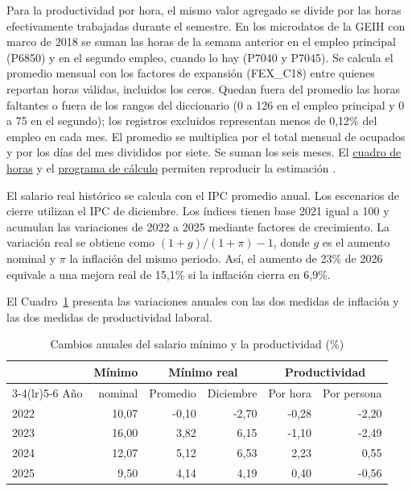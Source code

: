 Para la productividad por hora, el mismo valor agregado se divide por las horas efectivamente trabajadas durante el semestre. En los microdatos de la GEIH con marco de 2018 se suman las horas de la semana anterior en el empleo principal (P6850) y en el segundo empleo, cuando lo hay (P7040 y P7045). Se calcula el promedio mensual con los factores de expansión (FEX\_C18) entre quienes reportan horas válidas, incluidos los ceros. Quedan fuera del promedio las horas faltantes o fuera de los rangos del diccionario (0 a 126 en el empleo principal y 0 a 75 en el segundo); los registros excluidos representan menos de 0,12\% del empleo en cada mes. El promedio se multiplica por el total mensual de ocupados y por los días del mes divididos por siete. Se suman los seis meses. El \href{https://github.com/oliverpardo1979/Informe-CJC-SM/blob/main/data/horas_primer_semestre_2021_2026.csv}{cuadro de horas} y el \href{https://github.com/oliverpardo1979/Informe-CJC-SM/blob/main/scripts/productividad_por_hora.py}{programa de cálculo} permiten reproducir la estimación \citep{geihMicro2021,geihMicro2026}.

El salario real histórico se calcula con el IPC promedio anual. Los escenarios de cierre utilizan el IPC de diciembre. Los índices tienen base 2021 igual a 100 y acumulan las variaciones de 2022 a 2025 mediante factores de crecimiento. La variación real se obtiene como $(1+g)/(1+\pi)-1$, donde $g$ es el aumento nominal y $\pi$ la inflación del mismo periodo. Así, el aumento de 23\% de 2026 equivale a una mejora real de 15,1\% si la inflación cierra en 6,9\%.

El Cuadro~\ref{tab:anual} presenta las variaciones anuales con las dos medidas de inflación y las dos medidas de productividad laboral.

\begin{table}[H]
\centering\small
\caption{Cambios anuales del salario mínimo y la productividad (\%)}
\label{tab:anual}
\begin{tabular}{lrrrrr}
\toprule
& Mínimo & \multicolumn{2}{c}{Mínimo real} & \multicolumn{2}{c}{Productividad}\\
\cmidrule(lr){3-4}\cmidrule(lr){5-6}
Año & nominal & Promedio & Diciembre & Por hora & Por persona\\
\midrule
2022 & 10,07 & -0,10 & -2,70 & -0,28 & -2,20 \\
2023 & 16,00 & 3,82 & 6,15 & -1,10 & -2,49 \\
2024 & 12,07 & 5,12 & 6,53 & 2,23 & 0,55 \\
2025 & 9,50 & 4,14 & 4,19 & 0,40 & -0,56 \\
\bottomrule
\end{tabular}
\end{table}

